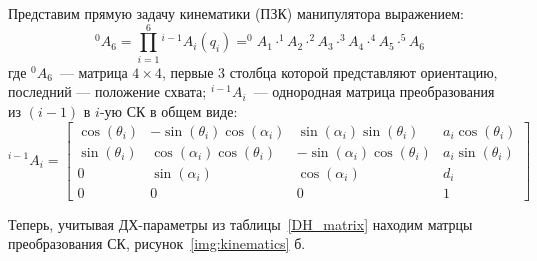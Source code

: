 Представим прямую задачу кинематики (ПЗК) манипулятора выражением:
\begin{equation}\label{fk}
	^0A_6 = \prod^{6}_{i=1}{^{i-1}A_i(q_i)} = ^0A_1 \cdot ^1A_2 \cdot ^2A_3 \cdot ^3A_4 \cdot ^4A_5 \cdot ^5A_6
\end{equation}
где $^0A_6$~--- матрица $4 \times 4$, первые $3$ столбца которой представляют ориентацию, последний --- положение схвата; $^{i-1}A_i$~--- однородная матрица преобразования из $(i-1)$ в $i$-ую СК в общем виде:
\begin{equation}
	^{i-1}A_i = 
	\left[\begin{matrix}
	\cos{\left (\theta_i \right )} & - \sin{\left (\theta_i \right )} \cos{\left (\alpha_i \right )} & \sin{\left (\alpha_i \right )} \sin{\left (\theta_i \right )} & a_{i} \cos{\left (\theta_i \right )}\\
	\sin{\left (\theta_i \right )} & \cos{\left (\alpha_i \right )} \cos{\left (\theta_i \right )} & - \sin{\left (\alpha_i \right )} \cos{\left (\theta_i \right )} & a_{i} \sin{\left (\theta_i \right )}\\
	0 & \sin{\left (\alpha_i \right )} & \cos{\left (\alpha_i \right )} & d_{i}\\
	0 & 0 & 0 & 1
	\end{matrix}\right]
\end{equation}

Теперь, учитывая ДХ-параметры из таблицы~\ref{DH_matrix} находим матрцы преобразования СК, рисунок~\ref{img:kinematics} б.

